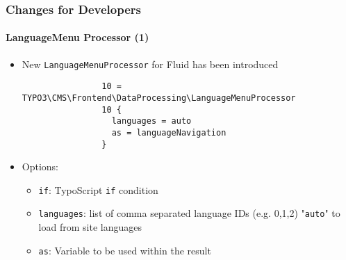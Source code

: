 \begin{frame}[fragile]
	\frametitle{Changes for Developers}
	\framesubtitle{LanguageMenu Processor (1)}

	\lstset{basicstyle=\tiny\ttfamily}

	\begin{itemize}
		\item New \texttt{LanguageMenuProcessor} for Fluid has been introduced

			\begin{lstlisting}
				10 = TYPO3\CMS\Frontend\DataProcessing\LanguageMenuProcessor
				10 {
				  languages = auto
				  as = languageNavigation
				}
			\end{lstlisting}

		\item Options:

			\begin{itemize}

				\item \texttt{if}: TypoScript \texttt{if} condition
				\item \texttt{languages}: list of comma separated language IDs
					(e.g. 0,1,2) "\texttt{auto}" to load from site languages
				\item \texttt{as}: Variable to be used within the result
			\end{itemize}

	\end{itemize}

\end{frame}


